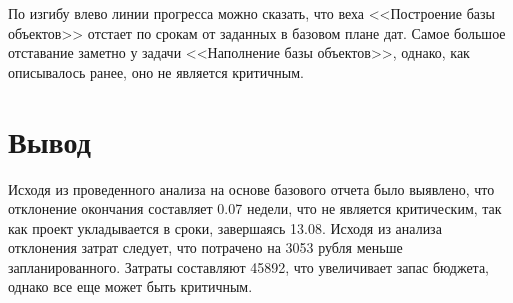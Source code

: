 По изгибу влево линии прогресса можно сказать, что веха <<Построение базы объектов>> отстает по срокам от заданных в базовом плане дат.
Самое большое отставание заметно у задачи <<Наполнение базы объектов>>, однако, как описывалось ранее, оно не является критичным.

\section*{Вывод}

Исходя из проведенного анализа на основе базового отчета было выявлено, что отклонение окончания составляет 0.07 недели, что не является критическим, так как проект укладывается в сроки, завершаясь 13.08.
Исходя из анализа отклонения затрат следует, что потрачено на 3053 рубля меньше запланированного. 
Затраты составляют 45892, что увеличивает запас бюджета, однако все еще может быть критичным.
